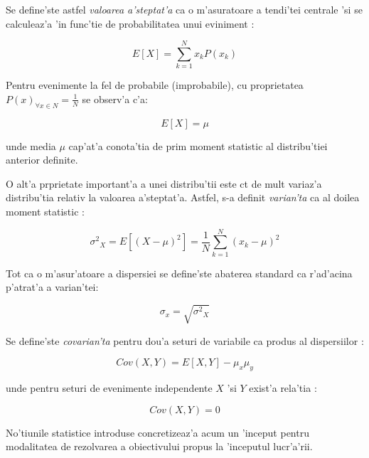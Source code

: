 \documentclass[12pt,a4paper,twoside]{report}
\begin{document}
Se define'ste astfel \textit{valoarea a'steptat'a} ca o m'asuratoare a tendi'tei centrale 'si se calculeaz'a 'in func'tie de probabilitatea unui eviniment \cite{10.1115/1.3662552}:

\begin{equation}
    E[X] = \sum _{k=1}^{N}x_{k} P(x_k)
\end{equation}

Pentru evenimente la fel de probabile (improbabile), cu proprietatea $P(x)_{\forall x \in N} = \frac{1}{N}$ se observ'a c'a:

\begin{equation}
    E[X] = \mu
\end{equation}

unde media $\mu$ cap'at'a conota'tia de prim moment statistic al distribu'tiei anterior definite.

\vspace{5px}

O alt'a prprietate important'a a unei distribu'tii este c\ia t de mult variaz'a distribu'tia relativ la valoarea a'steptat'a. Astfel, s-a definit \textit{varian'ta} ca al doilea moment statistic \cite{VarCoVar}:

\begin{equation}
    {\sigma^2}_X = E[(X - \mu)^2] = \frac{1}{N} \sum_{k=1}^{N}(x_k - \mu)^2
\end{equation}

Tot ca o m'asur'atoare a dispersiei se define'ste abaterea standard ca r'ad'acina p'atrat'a a varian'tei:

\begin{equation}
    \sigma_x = \sqrt{{\sigma^2}_X }
\end{equation}

Se define'ste \textit{covarian'ta} pentru dou'a seturi de variabile ca produs al dispersiilor \cite{VarCoVar}:

\begin{equation}
    Cov(X,Y) = E[X,Y] - \mu_x \mu_y
\end{equation}

unde pentru seturi de evenimente independente $X$ 'si $Y$ exist'a rela'tia \cite{VarCoVar}:

\begin{equation}
    Cov(X,Y) = 0
\end{equation}

No'tiunile statistice introduse concretizeaz'a acum un 'inceput pentru modalitatea de rezolvarea a obiectivului propus la 'inceputul lucr'a'rii. 
\end{document}
